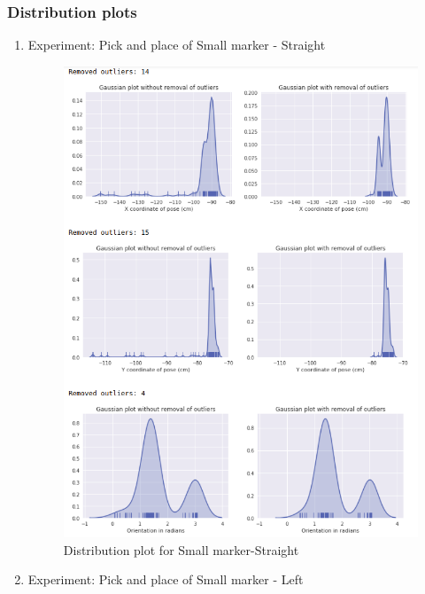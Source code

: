 \documentclass[11pt,a4paper]{article}
\begin{document}
				\subsubsection{Distribution plots}
				\begin{enumerate}
				\item Experiment: Pick and place of Small marker - Straight
				\begin{figure}[H]
					\centering
					\includegraphics[scale=0.6]{small-str}	
					\caption{Distribution plot for Small marker-Straight}
				\end{figure}
				\newpage
				\item Experiment: Pick and place of Small marker - Left
				\begin{figure}[H]
					\centering

\end{figure}
\end{enumerate}
\end{document}
